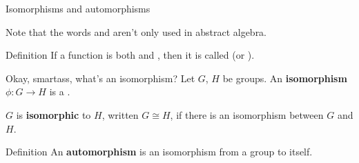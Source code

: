 \documentclass[8pt, handout]{beamer}
\begin{document}
\begin{frame}{Isomorphisms and automorphisms}

  Note that the words  and  aren't only used in abstract algebra. \pause

  \begin{block}{Definition}
    If a function is both  and
    , then it is called  (or ).
  \end{block} \pause
  \begin{block}{Okay, smartass, what's an isomorphism?} \pause
    Let $G$, $H$ be groups. An \textbf{isomorphism} $\phi: G \to H$ is a  . \pause

    \smallskip

    $G$ is \textbf{isomorphic} to $H$, written $G\cong H$, if there is an isomorphism between $G$ and $H$.
  \end{block} \pause
  \begin{block}{Definition}
    An \textbf{automorphism} is an isomorphism from a group to itself.
  \end{block}
\end{frame}

\end{document}
